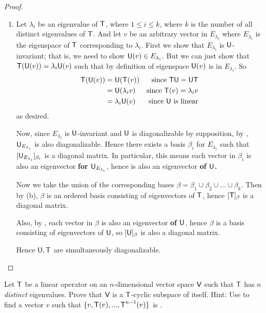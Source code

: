 \begin{proof} \ 

\begin{enumerate}
\item

Let \(\lambda_i\) be an eigenvalue of \(\textsf{T}\), where \(1 \le i \le k\), where \(k\) is the number of all distinct eigenvalues of \(\textsf{T}\).
And let \(v\) be an arbitrary vector in \(E_{\lambda_i}\) where \(E_{\lambda_i}\) is the eigenspace of \(\textsf{T}\) corresponding to \(\lambda_i\).
First we show that \(E_{\lambda_i}\) is \(\textsf{U}\)-invariant; that is, we need to show \(\textsf{U}(v) \in E_{\lambda_i}\).
But we can just show that \(\textsf{T}(\textsf{U}(v)) = \lambda_i \textsf{U}(v)\) such that by definition of eigenspace \(\textsf{U}(v)\) is in \(E_{\lambda_i}\).
So
\begin{align*}
    \textsf{T}(\textsf{U}(v))
        & = \textsf{U}(\textsf{T}(v)) & \text{since \(\textsf{T}\textsf{U}= \textsf{U}\textsf{T}\)} \\
        & = \textsf{U}( \lambda_i v ) & \text{since \(\textsf{T}(v) = \lambda_i v\)} \\
        & = \lambda_i \textsf{U}(v) & \text{since \(\textsf{U}\) is linear}
\end{align*}
as desired.

Now, since \(E_{\lambda_i}\) is \(\textsf{U}\)-invariant and \(\textsf{U}\) is diagonalizable by supposition, by , \(\textsf{U}_{E_{\lambda_i}}\) is also diagonalizable.
Hence there exists a basis \(\beta_i\) for \(E_{\lambda_i}\) such that \([\textsf{U}_{E_{\lambda_i}}]_{\beta_i}\) is a diagonal matrix.
In particular, this means each vector in \(\beta_i\) is also an eigenvector \textbf{for \(\textsf{U}_{E_{\lambda_i}}\)}, hence is also an eigenvector \textbf{of \(\textsf{U}\).} 


Now we take the union of the corresponding bases \(\beta = \beta_1 \cup \beta_2 \cup ... \cup \beta_k\).
Then by (b), \(\beta\) is an ordered basis consisting of eigenvectors of \(\textsf{T}\), hence \([\textsf{T}]_{\beta}\) is a diagonal matrix.

Also, by , each vector in \(\beta\) is also an eigenvector \textbf{of \(\textsf{U}\)}, hence \(\beta\) is a basis consisting of eigenvectors of \(\textsf{U}\), so \([\textsf{U}]_{\beta}\) is also a diagonal matrix.

Hence \(\textsf{U}, \textsf{T}\) are simultaneously diagonalizable.
\end{enumerate}
\end{proof}

\begin{exercise} \label{exercise 5.4.26}
Let \(\textsf{T}\) be a linear operator on an \(n\)-dimensional vector space \(\textsf{V}\) such that \(\textsf{T}\) has \(n\) \emph{distinct} eigenvalues.
Prove that \(\textsf{V}\) is a \(\textsf{T}\)-cyclic subspace of itself.
Hint: Use  to find a vector \(v\) such that \(\{ v, \textsf{T}(v), ..., \textsf{T}^{n-1}(v) \}\) is \LID{}.
\end{exercise}

